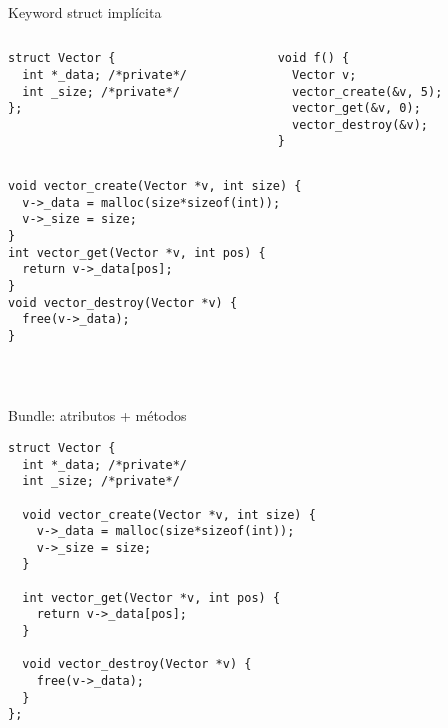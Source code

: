 ~%
\begin{frame}{Keyword struct impl\'icita}
   \begin{columns}[t]
      \begin{column}{.4\linewidth}
         \begin{lstlisting}[style=normal,firstnumber=1]
struct Vector {
  int *_data; /*private*/
  int _size; /*private*/
};


         \end{lstlisting}
      \end{column}
      \begin{column}{.4\linewidth}
         \begin{lstlisting}[style=normal,firstnumber=15,linebackgroundcolor={%
                 \btLstHLB<1>{16}%
         }]
void f() {
  Vector v;
  vector_create(&v, 5);
  vector_get(&v, 0);
  vector_destroy(&v);
}
         \end{lstlisting}
      \end{column}
   \end{columns}

   \begin{columns}[t]
      \begin{column}{.4\linewidth}
        \begin{lstlisting}[style=normal,firstnumber=5]
void vector_create(Vector *v, int size) {
  v->_data = malloc(size*sizeof(int));
  v->_size = size;
}
int vector_get(Vector *v, int pos) {
  return v->_data[pos];
}
void vector_destroy(Vector *v) {
  free(v->_data);
}

        \end{lstlisting}
      \end{column}
      \begin{column}{.4\linewidth}
      \end{column}
   \end{columns}
\end{frame}
~%

\begin{frame}[fragile]{Bundle: atributos + m\'etodos}
        \begin{lstlisting}[style=normal,firstnumber=1]
struct Vector {
  int *_data; /*private*/
  int _size; /*private*/

  void vector_create(Vector *v, int size) {
    v->_data = malloc(size*sizeof(int));
    v->_size = size;
  }

  int vector_get(Vector *v, int pos) {
    return v->_data[pos];
  }

  void vector_destroy(Vector *v) {
    free(v->_data);
  }
};
        \end{lstlisting}
\end{frame}

